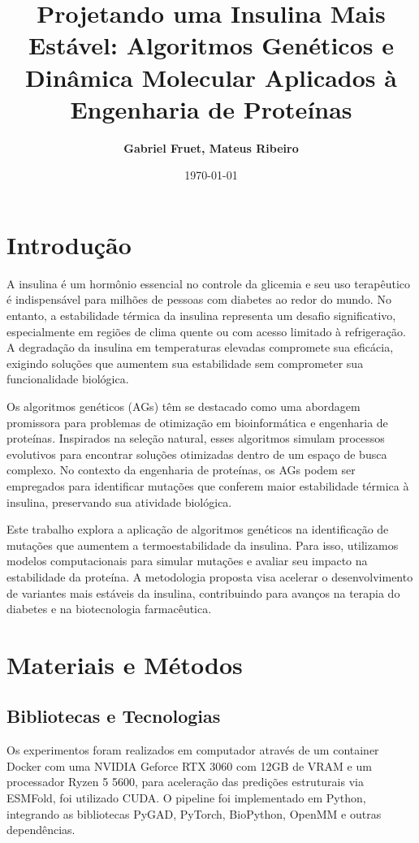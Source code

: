 \documentclass[12pt]{extarticle}
\title{\textbf{Projetando uma Insulina Mais Estável: Algoritmos Genéticos e Dinâmica Molecular Aplicados à Engenharia de Proteínas}}
\author{\textbf{Gabriel Fruet, Mateus Ribeiro }}
\date{\today}
\begin{document}
\maketitle	

\section{Introdução}

A insulina é um hormônio essencial no controle da glicemia e seu uso
terapêutico é indispensável para milhões de pessoas com diabetes ao redor do
mundo. No entanto, a estabilidade térmica da insulina representa um desafio
significativo, especialmente em regiões de clima quente ou com acesso limitado
à refrigeração. A degradação da insulina em temperaturas elevadas compromete
sua eficácia, exigindo soluções que aumentem sua estabilidade sem comprometer
sua funcionalidade biológica.  

Os algoritmos genéticos (AGs) têm se destacado como uma abordagem promissora
para problemas de otimização em bioinformática e engenharia de proteínas.
Inspirados na seleção natural, esses algoritmos simulam processos evolutivos
para encontrar soluções otimizadas dentro de um espaço de busca complexo. No
contexto da engenharia de proteínas, os AGs podem ser empregados para
identificar mutações que conferem maior estabilidade térmica à insulina,
preservando sua atividade biológica.  

Este trabalho explora a aplicação de algoritmos genéticos na identificação de
mutações que aumentem a termoestabilidade da insulina. Para isso, utilizamos
modelos computacionais para simular mutações e avaliar seu impacto na
estabilidade da proteína. A metodologia proposta visa acelerar o
desenvolvimento de variantes mais estáveis da insulina, contribuindo para
avanços na terapia do diabetes e na biotecnologia farmacêutica.  

\section{Materiais e Métodos}

\subsection{Bibliotecas e Tecnologias}

Os experimentos foram realizados em computador através de um container Docker
com uma NVIDIA Geforce RTX 3060 com 12GB de VRAM e um processador Ryzen 5 5600,
para aceleração das predições estruturais via ESMFold, foi utilizado CUDA. O
pipeline foi implementado em Python, integrando as bibliotecas PyGAD, PyTorch,
BioPython, OpenMM e outras dependências.
\end{document}
